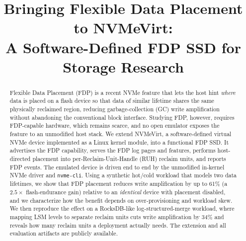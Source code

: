 \documentclass[conference,10pt]{IEEEtran}
\begin{document}
\title{Bringing Flexible Data Placement to NVMeVirt:\\
A Software-Defined FDP SSD for Storage Research}

\author{%
\and
{}
\and
{}
}

\maketitle

\begin{abstract}
Flexible Data Placement (FDP) is a recent NVMe feature that lets the host hint
\emph{where} data is placed on a flash device so that data of similar lifetime
shares the same physically reclaimed region, reducing garbage-collection (GC)
write amplification without abandoning the conventional block interface.
Studying FDP, however, requires FDP-capable hardware, which remains scarce, and
no open emulator exposes the feature to an unmodified host stack. We extend
NVMeVirt, a software-defined virtual NVMe device implemented as a Linux kernel
module, into a functional FDP SSD. It advertises the FDP capability, serves the
FDP log pages and features, performs host-directed placement into
per-Reclaim-Unit-Handle (RUH) reclaim units, and reports FDP events. The emulated
device is driven end to end by the unmodified in-kernel NVMe driver and
\texttt{nvme-cli}. Using a synthetic
hot/cold workload that models two data lifetimes, we show that FDP placement
reduces write amplification by up to 61\% (a $2.5\times$ flash-endurance gain)
relative to an \emph{identical} device with placement disabled, and we
characterize how the benefit depends on over-provisioning and workload skew. We
then reproduce the effect on a RocksDB-like log-structured-merge workload, where
mapping LSM levels to separate reclaim units cuts write amplification by 34\%
and reveals how many reclaim units a deployment actually needs.
The extension and all evaluation artifacts are publicly available.
\end{abstract}
\end{document}
